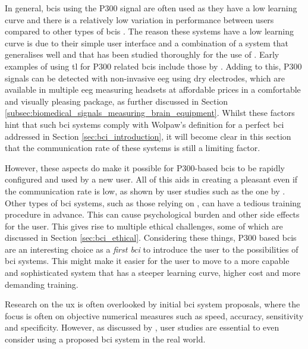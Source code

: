 In general, \glspl{bci} using the P300 signal are often used as they have a low learning curve and there is a relatively low variation in performance between users compared to other types of \glspl{bci} \citep{p300_spellers, p300_spellers_review}.
The reason these systems have a low learning curve is due to their simple user interface and a combination of a system that generalises well and that has been studied thoroughly for the use of .
Early examples of using \gls{tl} for P300 related \glspl{bci} include those by \citet{p300_speller_tl}.
Adding to this, P300 signals can be detected with non-invasive \gls{eeg} using dry electrodes, which are available in multiple \gls{eeg} measuring headsets at affordable prices in a comfortable and visually pleasing package, as further discussed in Section \ref{subsec:biomedical_signals_measuring_brain_equipment}.
Whilst these factors hint that such \gls{bci} systems comply with Wolpaw's definition for a perfect \gls{bci} addressed in Section \ref{sec:bci_introduction}, it will become clear in this section that the communication rate of these systems is still a limiting factor.

However, these aspects do make it possible for P300-based \glspl{bci} to be rapidly configured and used by a new user.
All of this aids in creating a pleasant  even if the communication rate is low, as shown by user studies such as the one by \citet{p300_speller_real_life2}.
Other types of \gls{bci} systems, such as those relying on , can have a tedious training procedure in advance.
This can cause psychological burden and other side effects for the user.
This gives rise to multiple ethical challenges, some of which are discussed in Section \ref{sec:bci_ethical}.
Considering these things, P300 based \glspl{bci} are an interesting choice as a \textit{first \gls{bci}} to introduce the user to the possibilities of \gls{bci} systems.
This might make it easier for the user to move to a more capable and sophisticated system that has a steeper learning curve, higher cost and more demanding training.

Research on the \gls{ux} is often overlooked by initial \gls{bci} system proposals, where the focus is often on objective numerical measures such as speed, accuracy, sensitivity and specificity.
However, as discussed by \citet{thesis_arnau}, user studies are essential to even consider using a proposed \gls{bci} system in the real world.


